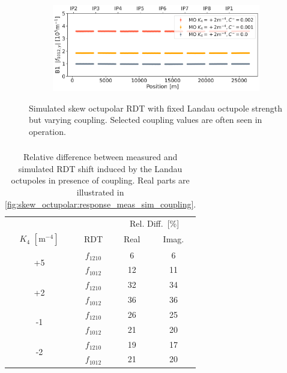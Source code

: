 \begin{figure}[!htb]
    \centering
    \begin{subfigure}{0.8\textwidth}
        \includegraphics[width=\textwidth]{./images/skew_octupoles/f1012_coupling_sim_AMP.pdf}
    \end{subfigure}
    \caption{Simulated skew octupolar RDT with fixed Landau octupole strength but varying coupling.
    Selected coupling values are often seen in operation.}
    \label{fig:skew_octupolar:sim_coupling}
\end{figure}



\FloatBarrier
\subsubsection{}

\begin{table}[!htb]
    \centering
    \begin{tabular}{cccc}
    \toprule
    &&\multicolumn{2}{c}{Rel. Diff. [\%]} \\
    \cmidrule{3-4}
    $K_4$ $[\text{m}^{-4}]$ & RDT & Real & Imag. \\
    \midrule
    \multirow{2}{*}{+5}
     & $f_{1210}$ & 6 & 6  \\
     & $f_{1012}$ & 12  & 11 \\[0.5em]
    \multirow{2}{*}{+2}
     & $f_{1210}$ & 32  & 34  \\
     & $f_{1012}$ & 36  & 36  \\[0.5em]
    \multirow{2}{*}{-1}
     & $f_{1210}$ & 26 & 25 \\
     & $f_{1012}$ & 21 & 20 \\[0.5em]
    \multirow{2}{*}{-2}
     & $f_{1210}$ & 19  & 17  \\
     & $f_{1012}$ & 21 & 20 \\
    \bottomrule
    \end{tabular}
    \caption{Relative difference between measured and simulated RDT shift induced by the
    Landau octupoles in presence of coupling. Real parts are illustrated in
    \cref{fig:skew_octupolar:response_meas_sim_coupling}.}
    \label{tab:skew_octupolar:rms_ratios}
\end{table}

